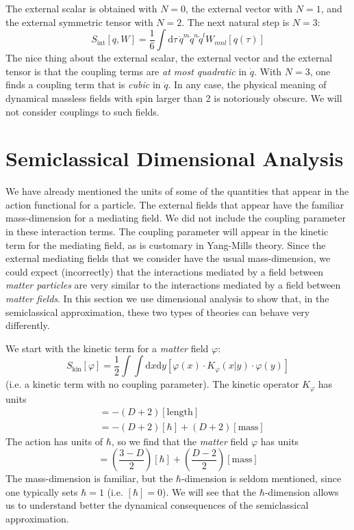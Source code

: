 The external scalar is obtained with $N = 0$, the external vector with $N = 1$, and the external symmetric tensor with $N = 2$. The next natural step is $N = 3$:
\begin{equation}
	S_{\text{int}}[q, W] = \frac{1}{6} \int \mathrm{d}\tau \, \dot{q}^{m} \dot{q}^{n} \dot{q}^{l} W_{mnl}[q(\tau)]
\end{equation}
The nice thing about the external scalar, the external vector and the external tensor is that the coupling terms are \textit{at most quadratic} in $\dot{q}$. With $N = 3$, one finds a coupling term that is \textit{cubic} in $\dot{q}$. In any case, the physical meaning of dynamical massless fields with spin larger than 2 is notoriously obscure. We will not consider couplings to such fields.
\section{Semiclassical Dimensional Analysis\label{SecDimAn}}
We have already mentioned the units of some of the quantities that appear in the action functional for a particle. The external fields that appear have the familiar mass-dimension for a mediating field. We did not include the coupling parameter in these interaction terms. The coupling parameter will appear in the kinetic term for the mediating field, as is customary in Yang-Mills theory. Since the external mediating fields that we consider have the usual mass-dimension, we could expect (incorrectly) that the interactions mediated by a field between \textit{matter particles} are very similar to the interactions mediated by a field between \textit{matter fields}. In this section we use dimensional analysis to show that, in the semiclassical approximation, these two types of theories can behave very differently.

We start with the kinetic term for a \textit{matter} field $\varphi$:
\begin{equation}
	S_{\text{kin}}[\varphi] = \frac{1}{2} \int \int \mathrm{d}x \mathrm{d}y \left[ \varphi(x) \cdot K_{\varphi}(x|y) \cdot \varphi(y)  \right]
\end{equation}
(i.e. a kinetic term with no coupling parameter). The kinetic operator $K_{\varphi}$ has units
\begin{align}
	[ K_{\varphi} ] &= -(D + 2) [ \text{length} ] \nonumber \\
	&= -(D + 2) [\hbar] + (D + 2) [ \text{mass} ]
\end{align}
The action has units of $\hbar$, so we find that the \textit{matter} field $\varphi$ has units
\begin{equation}
	[\varphi] = \left( \frac{3 - D}{2} \right) [\hbar] + \left( \frac{D - 2}{2} \right) [\text{mass}] \label{aUnits}
\end{equation}
The mass-dimension is familiar, but the $\hbar$-dimension is seldom mentioned, since one typically sets $\hbar = 1$ (i.e. $[\hbar] = 0$). We will see that the $\hbar$-dimension allows us to understand better the dynamical consequences of the semiclassical approximation.


